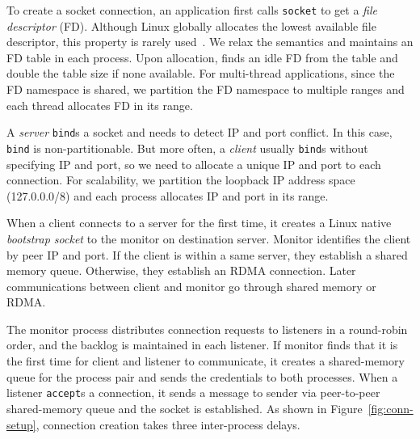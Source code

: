 To create a socket connection, an application first calls \texttt{socket} to get a \textit{file descriptor} (FD). Although Linux globally allocates the lowest available file descriptor, this property is rarely used~\cite{han2012megapipe,huang2017high}. We relax the semantics and maintains an FD table in each process. Upon allocation, \libipc{} finds an idle FD from the table and double the table size if none available. 
For multi-thread applications, since the FD namespace is shared, we partition the FD namespace to multiple ranges and each thread allocates FD in its range.

A \emph{server} \texttt{bind}s a socket and needs to detect IP and port conflict. In this case, \texttt{bind} is non-partitionable.
But more often, a \emph{client} usually \texttt{bind}s without specifying IP and port, so we need to allocate a unique IP and port to each connection. For scalability, we partition the loopback IP address space (127.0.0.0/8) and each process allocates IP and port in its range.

When a client connects to a server for the first time, it creates a Linux native \textit{bootstrap socket} to the monitor on destination server. Monitor identifies the client by peer IP and port. If the client is within a same server, they establish a shared memory queue. Otherwise, they establish an RDMA connection. Later communications between client and monitor go through shared memory or RDMA.

The monitor process distributes connection requests to listeners in a round-robin order, and the backlog is maintained in each listener. If monitor finds that it is the first time for client and listener to communicate, it creates a shared-memory queue for the process pair and sends the credentials to both processes. When a listener \texttt{accept}s a connection, it sends a message to sender via peer-to-peer shared-memory queue and the socket is established. As shown in Figure~\ref{fig:conn-setup}, connection creation takes three inter-process delays.

